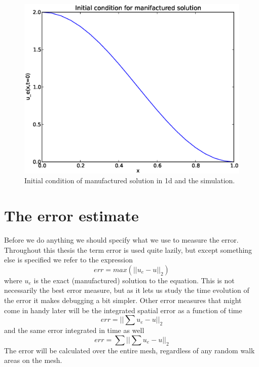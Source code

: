 \begin{figure}[H]
 \centering
 \includegraphics[scale=0.7]{../doc/results/experiment_31102013_1017/results/initial_condition.eps}
 \caption[Initial condition in 1d]{Initial condition of manufactured solution in 1d and the simulation.}
 \label{initial_condition_1d}
\end{figure}

\section{The error estimate}
Before we do anything we should specify what we use to measure the error. 
Throughout this thesis the term error is used quite lazily, but except something else is specified we refer to the expression 
\begin{equation}
 err = max\left(||u_e-u||_2\right)
\end{equation}
where $u_e$ is the exact (manufactured) solution to the equation. 
This is not necessarily the best error measure, but as it lets us study the time evolution of the error it makes debugging a bit simpler. 
Other error measures that might come in handy later will be the integrated spatial error as a function of time
\begin{equation}
 err = ||\sum u_e-u||_2
\end{equation}
and the same error integrated in time as well
\begin{equation}
 err = \sum||\sum u_e-u||_2
\end{equation}
The error will be calculated over the entire mesh, regardless of any random walk areas on the mesh.

